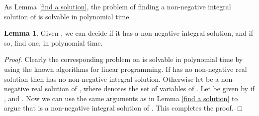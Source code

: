 \documentclass{article}
\theoremstyle{definition}
\newtheorem{lem}{Lemma}
\begin{document}
As Lemma \ref{find a solution}, the problem of finding a non-negative integral solution of  is solvable in polynomial time.
\begin{lem}
\label{find a solution for Omega}
Given , we can decide if it has a non-negative integral solution, and if so, find one, in polynomial time.
\end{lem}
\begin{proof}
Clearly the corresponding problem on  is solvable in polynomial time by using the known algorithms for linear programming. If  has no non-negative real solution then  has no non-negative integral solution. Otherwise let  be a non-negative real solution of , where  denotes the set of variables of . Let  be given by  if , and . Now we can use the same arguments as in Lemma \ref{find a solution} to argue that  is a non-negative integral solution of . This completes the proof.
\end{proof}
\end{document}
